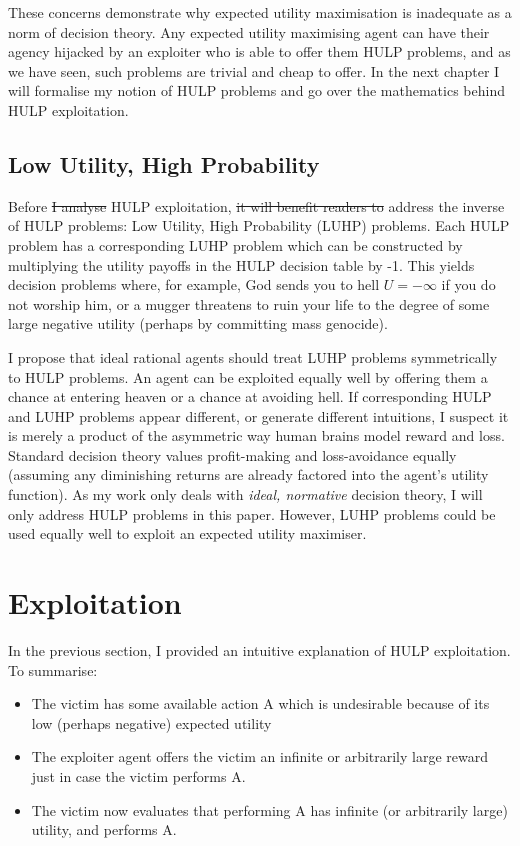 \documentclass{article}
\providecommand{\DIFadd}[1]{{\protect\color{blue}\uwave{#1}}} %
\providecommand{\DIFdel}[1]{{\protect\color{red}\sout{#1}}}                      %
\providecommand{\DIFaddbegin}{} %
\providecommand{\DIFaddend}{} %
\providecommand{\DIFdelbegin}{} %
\providecommand{\DIFdelend}{} %
\begin{document}
These concerns demonstrate why expected utility maximisation is inadequate as a norm of decision theory. Any expected utility maximising agent can have their agency hijacked by an exploiter who is able to offer them HULP problems, and as we have seen, such problems are trivial and cheap to offer. In the next chapter I will formalise my notion of HULP problems and go over the mathematics behind HULP exploitation.

\subsection{Low Utility, High Probability}

Before \DIFdelbegin \DIFdel{I analyse }\DIFdelend \DIFaddbegin \DIFadd{analysing }\DIFaddend HULP exploitation, \DIFdelbegin \DIFdel{it will benefit readers to }\DIFdelend \DIFaddbegin \DIFadd{I must }\DIFaddend address the inverse of HULP problems: Low Utility, High Probability (LUHP) problems. Each HULP problem has a corresponding LUHP problem which can be constructed by multiplying the utility payoffs in the HULP decision table by -1. This yields decision problems where, for example, God sends you to hell \(U=-\infty\) if you do not worship him, or a mugger threatens to ruin your life to the degree of some large negative utility (perhaps by committing mass genocide). 

I propose that ideal rational agents should treat LUHP problems symmetrically to HULP problems. An agent can be exploited equally well by offering them a chance at entering heaven or a chance at avoiding hell. If corresponding HULP and LUHP problems appear different, or generate different intuitions, I suspect it is merely a product of the asymmetric way human brains model reward and loss. Standard decision theory values profit-making and loss-avoidance equally (assuming any diminishing returns are already factored into the agent's utility function). As my work only deals with \textit{ideal, normative} decision theory, I will only address HULP problems in this paper. However, LUHP problems could be used equally well to exploit an expected utility maximiser.

\section{Exploitation}

In the previous section, I provided an intuitive explanation of HULP exploitation. To summarise:

\begin{itemize}
\item The victim has some available action A which is undesirable because of its low (perhaps negative) expected utility
\item The exploiter agent offers the victim an infinite or arbitrarily large reward just in case the victim performs A. 
\item The victim now evaluates that performing A has infinite (or arbitrarily large) utility, and performs A.
\end{itemize}
\end{document}
